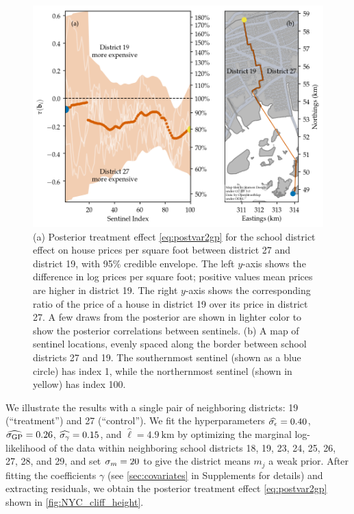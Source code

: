 \documentclass{article}
\newcommand{\autorefexternal}[1]{\autoref{#1}}
\begin{document}
\begin{figure}
  \begin{minipage}[c]{0.5\textwidth}
    \includegraphics[width=\textwidth]{figures/NYC_cliff_face.png}
  \end{minipage}\hfill
  \begin{minipage}[c]{0.5\textwidth}
    \caption{
        (a)
        Posterior treatment effect \autoref{eq:postvar2gp} for the school district effect on house prices per square foot between district 27 and district 19, with 95\% credible envelope.
        The left \(y\)-axis shows the difference in log prices per square foot; positive values mean prices are higher in district 19.
        The right \(y\)-axis shows the corresponding ratio of the price of a house in district 19 over its price in district 27.
        A few draws from the posterior are shown in lighter color to show the posterior correlations between sentinels.
        (b)
        A map of sentinel locations, evenly spaced along the border between school districts 27 and 19.
    	The southernmost sentinel (shown as a blue circle) has index 1, while the northernmost sentinel (shown in yellow) has index 100.\label{fig:NYC_cliff_height}
    } 
  \end{minipage}
\end{figure}

We illustrate the results with a single pair of neighboring districts: 19 (``treatment'') and 27 (``control'').
We fit the hyperparameters \(\widehat{\sigma_{\epsilon}}=0.40\), \(\widehat{\sigma_{\mathrm{GP}}}=0.26\), \(\widehat{\sigma_{\gamma}}=0.15\), and \(\widehat{\ell}=4.9~\text{km}\)
by optimizing the marginal log-likelihood of the data within neighboring school districts 18, 19, 23, 24, 25, 26, 27, 28, and 29,
and set \(\sigma_{m}=20\) to give the district means \(m_j\) a weak prior.
After fitting the coefficients \(\gamma\) (see \autorefexternal{sec:covariates} in Supplements for details) and extracting residuals, we obtain the posterior treatment effect \autoref{eq:postvar2gp} shown in \autoref{fig:NYC_cliff_height}.
\end{document}
